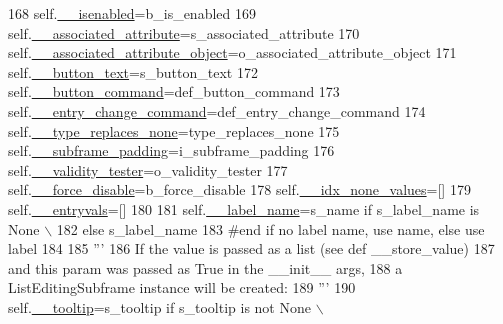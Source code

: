 \begin{DoxyCode}
168         self.\hyperlink{classnegui_1_1pgguiutilities_1_1KeyValFrame_a02d9e7225b8a2fb0eda398e68991e0e8}{\_\_isenabled}=b\_is\_enabled
169         self.\hyperlink{classnegui_1_1pgguiutilities_1_1KeyValFrame_a27b2ed9e7eeccc56397136ba42ccdaeb}{\_\_associated\_attribute}=s\_associated\_attribute
170         self.\hyperlink{classnegui_1_1pgguiutilities_1_1KeyValFrame_a73863067b82206c4f7d307be73ae5cd7}{\_\_associated\_attribute\_object}=o\_associated\_attribute\_object
171         self.\hyperlink{classnegui_1_1pgguiutilities_1_1KeyValFrame_abcbe36760268b6a6f2436527e3b45a77}{\_\_button\_text}=s\_button\_text
172         self.\hyperlink{classnegui_1_1pgguiutilities_1_1KeyValFrame_a0a4e9593fba1c3c0defc524ada661261}{\_\_button\_command}=def\_button\_command
173         self.\hyperlink{classnegui_1_1pgguiutilities_1_1KeyValFrame_ab739e0f7c56624637e862d2c1fcf1d7c}{\_\_entry\_change\_command}=def\_entry\_change\_command
174         self.\hyperlink{classnegui_1_1pgguiutilities_1_1KeyValFrame_ad522d9fdeb611fb4854199a952a782d9}{\_\_type\_replaces\_none}=type\_replaces\_none
175         self.\hyperlink{classnegui_1_1pgguiutilities_1_1KeyValFrame_a7509de20f07f2afdc2bc5fda8bec6c61}{\_\_subframe\_padding}=i\_subframe\_padding
176         self.\hyperlink{classnegui_1_1pgguiutilities_1_1KeyValFrame_a9d31fa82430833c2c2f23e4b28ac95f9}{\_\_validity\_tester}=o\_validity\_tester
177         self.\hyperlink{classnegui_1_1pgguiutilities_1_1KeyValFrame_aecb0c3c8630045b769f6bed4044d658b}{\_\_force\_disable}=b\_force\_disable
178         self.\hyperlink{classnegui_1_1pgguiutilities_1_1KeyValFrame_afbe0c687ff602e5d8e9eff5a410e98b4}{\_\_idx\_none\_values}=[]
179         self.\hyperlink{classnegui_1_1pgguiutilities_1_1KeyValFrame_a01ff8dc2236ac230d5349d72cc80663e}{\_\_entryvals}=[]
180         
181         self.\hyperlink{classnegui_1_1pgguiutilities_1_1KeyValFrame_a712bc54aa2ed3383fc4fe78943ed2ccb}{\_\_label\_name}=s\_name \textcolor{keywordflow}{if} s\_label\_name \textcolor{keywordflow}{is} \textcolor{keywordtype}{None} \(\backslash\)
182                                             \textcolor{keywordflow}{else} s\_label\_name       
183         \textcolor{comment}{#end if no label name, use name, else use label}
184 
185         \textcolor{stringliteral}{'''}
186 \textcolor{stringliteral}{        If the value is passed as a list (see def \_\_store\_value)}
187 \textcolor{stringliteral}{        and this param was passed as True in the \_\_init\_\_ args,}
188 \textcolor{stringliteral}{        a ListEditingSubframe instance will be created:}
189 \textcolor{stringliteral}{        '''}
190         self.\hyperlink{classnegui_1_1pgguiutilities_1_1KeyValFrame_aec6187c09dbe40b76b4452b25a0a141a}{\_\_tooltip}=s\_tooltip \textcolor{keywordflow}{if} s\_tooltip \textcolor{keywordflow}{is} \textcolor{keywordflow}{not} \textcolor{keywordtype}{None} \(\backslash\)

\end{DoxyCode}
